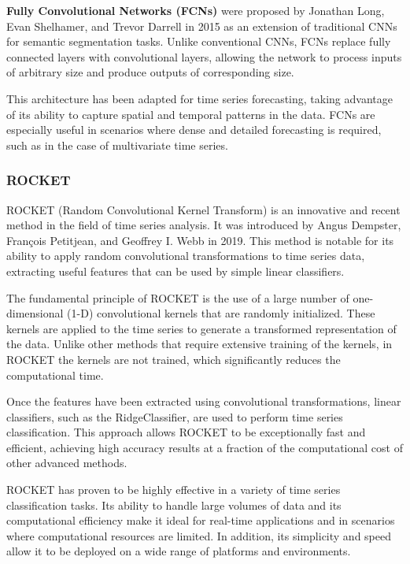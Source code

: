 \textbf{Fully Convolutional Networks (FCNs)}\cite{long2015fullyconvolutionalnetworkssemantic} were proposed by Jonathan Long, Evan Shelhamer, and Trevor Darrell in 2015 as an extension of traditional CNNs for semantic segmentation tasks. Unlike conventional CNNs, FCNs replace fully connected layers with convolutional layers, allowing the network to process inputs of arbitrary size and produce outputs of corresponding size.

This architecture has been adapted for time series forecasting, taking advantage of its ability to capture spatial and temporal patterns in the data. FCNs are especially useful in scenarios where dense and detailed forecasting is required, such as in the case of multivariate time series.
\vspace{10pt}

\subsubsection{ROCKET}
ROCKET (Random Convolutional Kernel Transform)\cite{Dempster_2020} is an innovative and recent method in the field of time series analysis. It was introduced by Angus Dempster, François Petitjean, and Geoffrey I. Webb in 2019. This method is notable for its ability to apply random convolutional transformations to time series data, extracting useful features that can be used by simple linear classifiers.

The fundamental principle of ROCKET is the use of a large number of one-dimensional (1-D) convolutional kernels that are randomly initialized. These kernels are applied to the time series to generate a transformed representation of the data. Unlike other methods that require extensive training of the kernels, in ROCKET the kernels are not trained, which significantly reduces the computational time.

Once the features have been extracted using convolutional transformations, linear classifiers, such as the RidgeClassifier, are used to perform time series classification. This approach allows ROCKET to be exceptionally fast and efficient, achieving high accuracy results at a fraction of the computational cost of other advanced methods.

ROCKET has proven to be highly effective in a variety of time series classification tasks. Its ability to handle large volumes of data and its computational efficiency make it ideal for real-time applications and in scenarios where computational resources are limited. In addition, its simplicity and speed allow it to be deployed on a wide range of platforms and environments.
\vspace{10pt}

